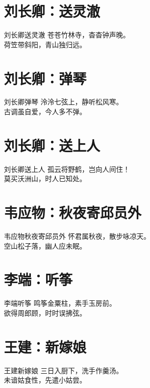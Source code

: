 \documentclass[12pt,oneside,a5paper]{book}
\begin{document}
\chapter{刘长卿：送灵澈}
\begin{poemzh}{刘长卿}{送灵澈}
苍苍竹林寺，杳杳钟声晚。\\
荷笠带斜阳，青山独归远。\\ 
\end{poemzh}

\chapter{刘长卿：弹琴}
\begin{poemzh}{刘长卿}{弹琴}
泠泠七弦上，静听松风寒。\\
古调虽自爱，今人多不弹。\\ 
\end{poemzh}

\chapter{刘长卿：送上人}
\begin{poemzh}{刘长卿}{送上人}
孤云将野鹤，岂向人间住！\\
莫买沃洲山，时人已知处。\\ 
\end{poemzh}

\chapter{韦应物：秋夜寄邱员外}
\begin{poemzh}{韦应物}{秋夜寄邱员外}
怀君属秋夜，散步咏凉天。\\
空山松子落，幽人应未眠。\\ 
\end{poemzh}

\chapter{李端：听筝}
\begin{poemzh}{李端}{听筝}
鸣筝金粟柱，素手玉房前。\\
欲得周郎顾，时时误拂弦。\\ 
\end{poemzh}

\chapter{王建：新嫁娘}
\begin{poemzh}{王建}{新嫁娘}
三日入厨下，洗手作羹汤。\\
未谙姑食性，先遣小姑尝。\\ 
\end{poemzh}
\end{document}
